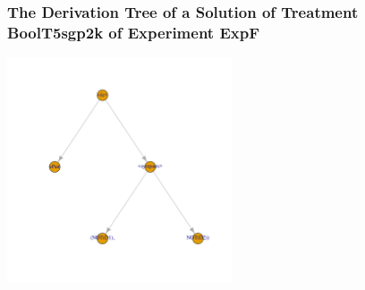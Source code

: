  \begin{frame}
 \frametitle{ The Derivation Tree of a Solution of Treatment BoolT5sgp2k of Experiment ExpF }
 \begin{center}
\includegraphics[width=0.5\textwidth, angle=0]
{ExpFDerivationTreeFigure003.pdf}
 \end{center}
 \label{report/ExpFDerivationTreeFigure003.pdf}  
 \end{frame}

